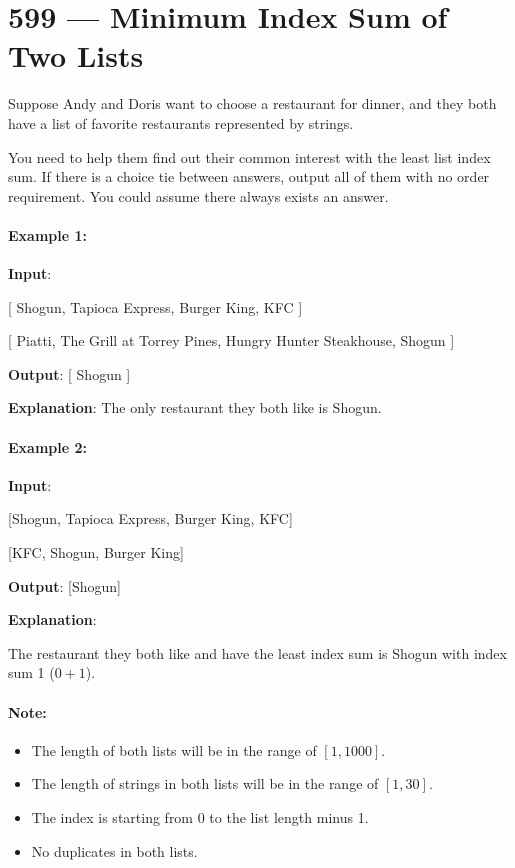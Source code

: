 \section{599 --- Minimum Index Sum of Two Lists}
Suppose Andy and Doris want to choose a restaurant for dinner, and they both have a list of favorite restaurants represented by strings.

You need to help them find out their common interest with the least list index sum. If there is a choice tie between answers, output all of them with no order requirement. You could assume there always exists an answer.

\paragraph{Example 1:}
\begin{flushleft}
\textbf{Input}:

[ Shogun, Tapioca Express, Burger King, KFC ]

[ Piatti, The Grill at Torrey Pines, Hungry Hunter Steakhouse, Shogun ]

\textbf{Output}: [ Shogun ]

\textbf{Explanation}: The only restaurant they both like is Shogun.
\end{flushleft}

\paragraph{Example 2:}

\begin{flushleft}
\textbf{Input}:

[Shogun, Tapioca Express, Burger King, KFC]

[KFC, Shogun, Burger King]

\textbf{Output}: [Shogun]

\textbf{Explanation}: 

The restaurant they both like and have the least index sum is Shogun with index sum 1 ($0+1$).
\end{flushleft}

\paragraph{Note:}
\begin{itemize}
\item The length of both lists will be in the range of $[1, 1000]$.
\item The length of strings in both lists will be in the range of $[1, 30]$.
\item The index is starting from 0 to the list length minus 1.
\item No duplicates in both lists.
\end{itemize}